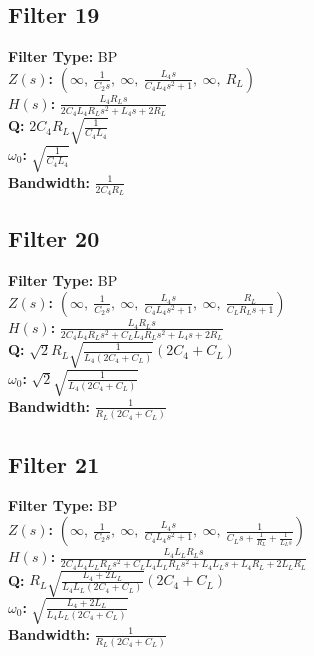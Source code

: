 \documentclass{article}
\begin{document}
\subsection*{Filter 19}
\textbf{Filter Type:} BP \\ 
\textbf{$Z(s)$:} $\left( \infty, \  \frac{1}{C_{2} s}, \  \infty, \  \frac{L_{4} s}{C_{4} L_{4} s^{2} + 1}, \  \infty, \  R_{L}\right)$ \\ 
\textbf{$H(s)$:} $\frac{L_{4} R_{L} s}{2 C_{4} L_{4} R_{L} s^{2} + L_{4} s + 2 R_{L}}$ \\ 
\textbf{Q:} $2 C_{4} R_{L} \sqrt{\frac{1}{C_{4} L_{4}}}$ \\ 
\textbf{$\omega_0$:} $\sqrt{\frac{1}{C_{4} L_{4}}}$ \\ 
\textbf{Bandwidth:} $\frac{1}{2 C_{4} R_{L}}$ \\ 
\subsection*{Filter 20}
\textbf{Filter Type:} BP \\ 
\textbf{$Z(s)$:} $\left( \infty, \  \frac{1}{C_{2} s}, \  \infty, \  \frac{L_{4} s}{C_{4} L_{4} s^{2} + 1}, \  \infty, \  \frac{R_{L}}{C_{L} R_{L} s + 1}\right)$ \\ 
\textbf{$H(s)$:} $\frac{L_{4} R_{L} s}{2 C_{4} L_{4} R_{L} s^{2} + C_{L} L_{4} R_{L} s^{2} + L_{4} s + 2 R_{L}}$ \\ 
\textbf{Q:} $\sqrt{2} R_{L} \sqrt{\frac{1}{L_{4} \left(2 C_{4} + C_{L}\right)}} \left(2 C_{4} + C_{L}\right)$ \\ 
\textbf{$\omega_0$:} $\sqrt{2} \sqrt{\frac{1}{L_{4} \left(2 C_{4} + C_{L}\right)}}$ \\ 
\textbf{Bandwidth:} $\frac{1}{R_{L} \left(2 C_{4} + C_{L}\right)}$ \\ 
\subsection*{Filter 21}
\textbf{Filter Type:} BP \\ 
\textbf{$Z(s)$:} $\left( \infty, \  \frac{1}{C_{2} s}, \  \infty, \  \frac{L_{4} s}{C_{4} L_{4} s^{2} + 1}, \  \infty, \  \frac{1}{C_{L} s + \frac{1}{R_{L}} + \frac{1}{L_{L} s}}\right)$ \\ 
\textbf{$H(s)$:} $\frac{L_{4} L_{L} R_{L} s}{2 C_{4} L_{4} L_{L} R_{L} s^{2} + C_{L} L_{4} L_{L} R_{L} s^{2} + L_{4} L_{L} s + L_{4} R_{L} + 2 L_{L} R_{L}}$ \\ 
\textbf{Q:} $R_{L} \sqrt{\frac{L_{4} + 2 L_{L}}{L_{4} L_{L} \left(2 C_{4} + C_{L}\right)}} \left(2 C_{4} + C_{L}\right)$ \\ 
\textbf{$\omega_0$:} $\sqrt{\frac{L_{4} + 2 L_{L}}{L_{4} L_{L} \left(2 C_{4} + C_{L}\right)}}$ \\ 
\textbf{Bandwidth:} $\frac{1}{R_{L} \left(2 C_{4} + C_{L}\right)}$ \\ 
\end{document}
